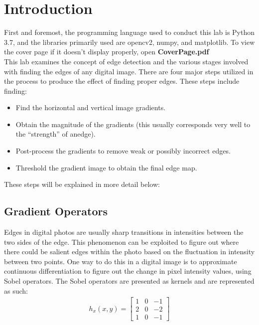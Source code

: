 \documentclass{article}
\begin{document}
	
	
	
	\section{Introduction}
	
	First and foremost, the programming language used to conduct this lab is Python 3.7, and the libraries primarily used are opencv2, numpy, and matplotlib. To view the cover page if it doesn't display properly, open \textbf{CoverPage.pdf}\\
	
	This lab examines the concept of edge detection and the various stages involved with finding the edges of any digital image. There are four major steps utilized in the process to produce the effect of finding proper edges. These steps include finding:\\
	 
	\begin{itemize}
		\item Find the horizontal and vertical image gradients.
		\item Obtain the magnitude of the gradients (this usually corresponds very well to the “strength” of anedge).
		\item Post-process the gradients to remove weak or possibly incorrect edges.
		\item Threshold the gradient image to obtain the final edge map.
	\end{itemize}

	\noindent These steps will be explained in more detail below:
	
	\subsection{Gradient Operators}
	
	Edges in digital photos are usually sharp transitions in intensities between the two sides of the edge. This phenomenon can be exploited to figure out where there could be salient edges within the photo based on the fluctuation in intensity between two points. One way to do this in a digital image is to approximate continuous differentiation to figure out the change in pixel intensity values, using Sobel operators. The Sobel operators are presented as kernels and are represented as such:\\
	
	\begin{align*}
	 h_{x}(x,y) = \left[
	 \begin{matrix}
	 	1 & 0 & -1\\
	 	2 & 0 & -2\\
	 	1 & 0 & -1
	 \end{matrix}
	 \right]
	\end{align*}
	
\end{document}
